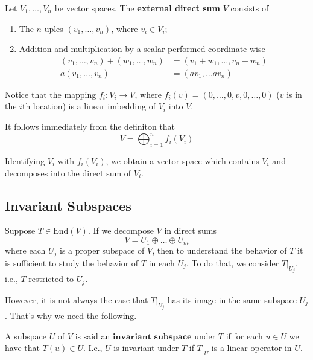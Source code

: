\begin{definition}
	Let $V_1, \ldots, V_n$ be vector spaces. The \textbf{external direct sum} $V$ consists of 
	\begin{enumerate}
		\item The $n$-uples $(v_1, \ldots, v_n)$, where $v_i \in V_i$;
		\item Addition and multiplication by a scalar performed coordinate-wise 
		\begin{equation*}
			\begin{aligned}
				(v_1, \ldots, v_n) + (w_1, \ldots, w_n) &= (v_1 + w_1, \ldots, v_n + w_n) \\
				a (v_1, \ldots, v_n) &= (av_1, \ldots av_n)
			\end{aligned}
		\end{equation*}
	\end{enumerate}
\end{definition}

Notice that the mapping $f_i : V_i \longrightarrow V$, where $f_i(v) = (0, \ldots, 0, v, 0, \ldots, 0)$ ($v$ is in the $i$th location) is a linear imbedding of $V_i$ into $V$.

It follows immediately from the definiton that
\[
	V = \bigoplus_{i=1}^n f_i(V_i)
\]

Identifying $V_i$ with $f_i(V_i)$, we obtain a vector space which contains $V_i$ and decomposes into the direct sum of $V_i$.


\subsection{Invariant Subspaces}

Suppose $T \in \text{End}(V)$. If we decompose $V$ in direct sums
	\[
		V = U_1 \oplus \ldots \oplus U_m
	\]
where each $U_j$ is a proper subspace of $V$, then to understand the behavior of $T$ it is sufficient to study the behavior of $T$ in each $U_j$. To do that, we consider $T|_{U_j}$, i.e., $T$ restricted to $U_j$.

However, it is not always the case that $T|_{U_j}$ has its image in the same subspace ${U_j}$. That's why we need the following.

\begin{definition}
	A subspace $U$ of $V$ is said an $\textbf{invariant subspace}$ under $T$ if for each $u \in U$ we have that $T(u) \in U$. I.e., $U$ is invariant under $T$ if $T|_U$ is a linear operator in $U$.
\end{definition}